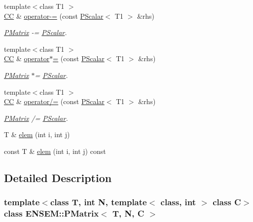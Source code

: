 \begin{DoxyCompactItemize}
{\footnotesize template$<$class T1 $>$ }\\\mbox{\hyperlink{classENSEM_1_1PMatrix_a744bac549029029effe32dc1705660ec}{CC}} \& \mbox{\hyperlink{classENSEM_1_1PMatrix_ad33381d53cc105f6f64869316aa0e2c2}{operator-\/=}} (const \mbox{\hyperlink{classENSEM_1_1PScalar}{P\+Scalar}}$<$ T1 $>$ \&rhs)
\begin{DoxyCompactList}\small\item\em \mbox{\hyperlink{classENSEM_1_1PMatrix}{P\+Matrix}} -\/= \mbox{\hyperlink{classENSEM_1_1PScalar}{P\+Scalar}}. \end{DoxyCompactList}\item 
{\footnotesize template$<$class T1 $>$ }\\\mbox{\hyperlink{classENSEM_1_1PMatrix_a744bac549029029effe32dc1705660ec}{CC}} \& \mbox{\hyperlink{classENSEM_1_1PMatrix_a4c25aeda146eb61d41abf6cf625a6153}{operator$\ast$=}} (const \mbox{\hyperlink{classENSEM_1_1PScalar}{P\+Scalar}}$<$ T1 $>$ \&rhs)
\begin{DoxyCompactList}\small\item\em \mbox{\hyperlink{classENSEM_1_1PMatrix}{P\+Matrix}} $\ast$= \mbox{\hyperlink{classENSEM_1_1PScalar}{P\+Scalar}}. \end{DoxyCompactList}\item 
{\footnotesize template$<$class T1 $>$ }\\\mbox{\hyperlink{classENSEM_1_1PMatrix_a744bac549029029effe32dc1705660ec}{CC}} \& \mbox{\hyperlink{classENSEM_1_1PMatrix_ade8246cb542a62e3368d33026885ca59}{operator/=}} (const \mbox{\hyperlink{classENSEM_1_1PScalar}{P\+Scalar}}$<$ T1 $>$ \&rhs)
\begin{DoxyCompactList}\small\item\em \mbox{\hyperlink{classENSEM_1_1PMatrix}{P\+Matrix}} /= \mbox{\hyperlink{classENSEM_1_1PScalar}{P\+Scalar}}. \end{DoxyCompactList}\item 
T \& \mbox{\hyperlink{classENSEM_1_1PMatrix_a358c5f1cd954ddda32677d9ad8765ef2}{elem}} (int i, int j)
\item 
const T \& \mbox{\hyperlink{classENSEM_1_1PMatrix_a5cacb33b2dcd4c33a9d3a135528a8bdf}{elem}} (int i, int j) const
\end{DoxyCompactItemize}


\subsection{Detailed Description}
\subsubsection*{template$<$class T, int N, template$<$ class, int $>$ class C$>$\newline
class E\+N\+S\+E\+M\+::\+P\+Matrix$<$ T, N, C $>$}

